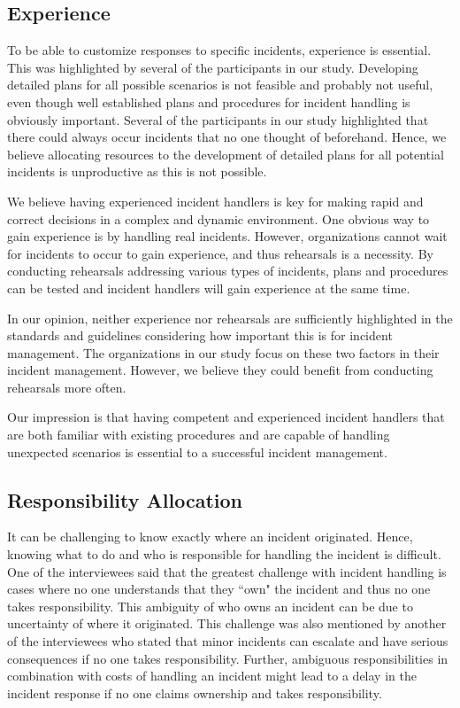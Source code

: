 \subsection{Experience}
\label{sec:experience}
To be able to customize responses to specific incidents, experience is essential. This was highlighted by several of the participants in our study. Developing detailed plans for all possible scenarios is not feasible and probably not useful, even though well established plans and procedures for incident handling is obviously important. Several of the participants in our study highlighted that there could always occur incidents that no one thought of beforehand. Hence, we believe allocating resources to the development of detailed plans for all potential incidents is unproductive as this is not possible.

We believe having experienced incident handlers is key for making rapid and correct decisions in a complex and dynamic environment. One obvious way to gain experience is by handling real incidents. However, organizations cannot wait for incidents to occur to gain experience, and thus rehearsals is a necessity. By conducting rehearsals addressing various types of incidents, plans and procedures can be tested and incident handlers will gain experience at the same time. 

In our opinion, neither experience nor rehearsals are sufficiently highlighted in the standards and guidelines considering how important this is for incident management. The organizations in our study focus on these two factors in their incident management. However, we believe they could benefit from conducting rehearsals more often.

Our impression is that having competent and experienced incident handlers that are both familiar with existing procedures and are capable of handling unexpected scenarios is essential to a successful incident management.

\subsection{Responsibility Allocation}
It can be challenging to know exactly where an incident originated. Hence, knowing what to do and who is responsible for handling the incident is difficult. One of the interviewees said that the greatest challenge with incident handling is cases where no one understands that they ``own" the incident and thus no one takes responsibility. This ambiguity of who owns an incident can be due to uncertainty of where it originated. This challenge was also mentioned by another of the interviewees who stated that minor incidents can escalate and have serious consequences if no one takes responsibility. Further, ambiguous responsibilities in combination with costs of handling an incident might lead to a delay in the incident response if no one claims ownership and takes responsibility. 

